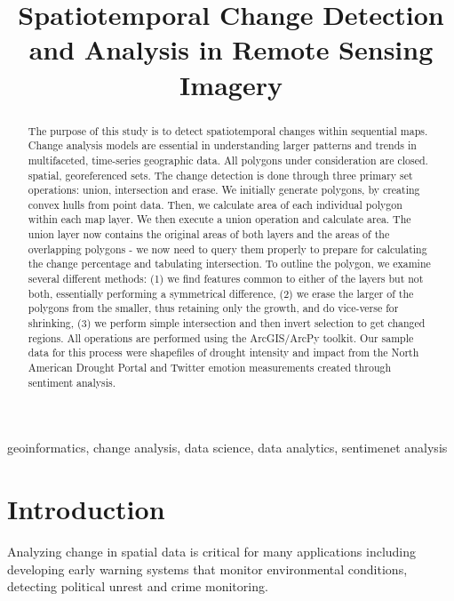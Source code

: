\documentclass[conference]{IEEEtran}
\begin{document}
\title{Spatiotemporal Change Detection and Analysis in Remote Sensing Imagery}

\author{
}
\maketitle

\begin{abstract}
The purpose of this study is to detect spatiotemporal changes within sequential maps. Change analysis models are essential in understanding larger patterns and trends in multifaceted, time-series geographic data. All polygons under consideration are closed. spatial, georeferenced sets. The change detection is done through three primary set operations: union, intersection and erase. We initially generate polygons, by creating convex hulls from point data. Then, we calculate area of each individual polygon within each map layer. We then execute a union operation and calculate area. The union layer now contains the original areas of both layers and the areas of the overlapping polygons - we now need to query them properly to prepare for calculating the change percentage and tabulating intersection. To outline the polygon, we examine several different methods: (1) we find features common to either of the layers but not both, essentially performing a symmetrical difference, (2) we erase the larger of the polygons from the smaller, thus retaining only the growth, and do vice-verse for shrinking, (3) we perform simple intersection and then invert selection to get changed regions. All operations are performed using the ArcGIS/ArcPy toolkit. Our sample data for this process were shapefiles of drought intensity and impact from the North American Drought Portal and Twitter emotion measurements created through sentiment analysis.
\end{abstract}

\begin{IEEEkeywords}
geoinformatics, change analysis, data science, data analytics, sentimenet analysis
\end{IEEEkeywords}


\section{Introduction}
Analyzing change in spatial data is critical for many applications including developing early warning systems that monitor environmental conditions, detecting political unrest and crime monitoring.
 
\end{document}
